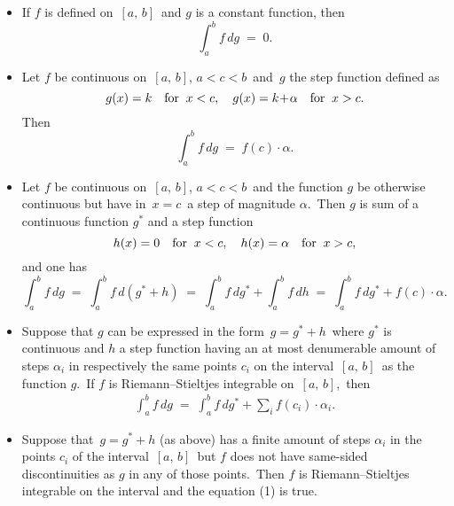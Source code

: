 \documentclass[12pt]{article}
\theoremstyle{definition}
\begin{document}
\begin{itemize}

\item If $f$ is defined on\, $[a,\,b]$\, and $g$ is a constant function, then
$$\int_a^bf\,dg \;=\; 0.$$

\item Let $f$ be continuous on\, $[a,\,b]$,\; $a < c < b$\, and\, $g$ the step function defined as
$$g(x) = k \quad \mbox{for\;\;} x < c, \quad g(x) =  k\!+\!\alpha \quad \mbox{for\;\;} x > c.$$
Then
$$\int_a^bf\,dg \;=\; f(c)\cdot\alpha.$$

\item Let $f$ be continuous on\, $[a,\,b]$,\; $a < c < b$\, and the function $g$ be otherwise continuous but have in\, $x = c$\, a step of magnitude $\alpha$.\, Then $g$ is sum of a continuous function $g^*$ and a step function
$$h(x) = 0 \quad \mbox{for\;\;} x < c, \quad h(x) = \alpha \quad \mbox{for\;\;} x > c,$$
and one has
$$
\int_a^bf\,dg \;=\; \int_a^bf\,d(g^*\!+\!h) \;=\; \int_a^bf\,dg^*+\int_a^bf\,dh \;=\; \int_a^bf\,dg^*+f(c)\cdot\alpha.
$$

\item Suppose that $g$ can be expressed in the form\, $g = g^*\!+\!h$\, where $g^*$ is continuous and $h$ a step function having an at most denumerable amount of steps $\alpha_i$ in respectively the same points $c_i$ on the interval \,$[a,\,b]$\, as the function $g$.\, If $f$ is Riemann--Stieltjes integrable on\, $[a,\,b]$,\, then 
\begin{align}
\int_a^bf\,dg \;=\; \int_a^bf\,dg^*+\sum_if(c_i)\cdot\alpha_i.
\end{align}

\item Suppose that\, $g = g^*\!+\!h$ (as above) has a finite amount of steps $\alpha_i$ in the points $c_i$ of the interval \,$[a,\,b]$\, but $f$ does not have same-sided discontinuities as $g$ in any of those points.\, Then $f$ is Riemann--Stieltjes integrable on the interval and the equation (1) is true.

\end{itemize}
\end{document}
